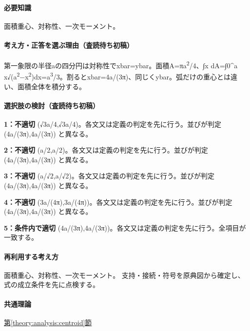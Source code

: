 \paragraph{必要知識} 面積重心、対称性、一次モーメント。

\paragraph{考え方・正答を選ぶ理由（査読待ち初稿）} 第一象限の半径aの四分円は対称性でxbar=\allowbreak{}ybar。面積A=πa\textsuperscript{2}/4、∫x dA=∫0\textasciicircum{}a x√(a\textsuperscript{2}−x\textsuperscript{2})dx=\allowbreak{}a\textsuperscript{3}/3。割るとxbar=\allowbreak{}4a/(3π)、同じくybar。弧だけの重心とは違い、面積全体を積分する。

\paragraph{選択肢の検討（査読待ち初稿）}\mbox{}\par

\noindent\textbf{1：不適切} (√3a/4,√3a/4)。各文又は定義の判定を先に行う。並びが判定 (4a/(3π),4a/(3π)) と異なる。\par

\noindent\textbf{2：不適切} (a/2,a/2)。各文又は定義の判定を先に行う。並びが判定 (4a/(3π),4a/(3π)) と異なる。\par

\noindent\textbf{3：不適切} (a/√2,a/√2)。各文又は定義の判定を先に行う。並びが判定 (4a/(3π),4a/(3π)) と異なる。\par

\noindent\textbf{4：不適切} (3a/(4π),3a/(4π))。各文又は定義の判定を先に行う。並びが判定 (4a/(3π),4a/(3π)) と異なる。\par

\noindent\textbf{5：条件内で適切} (4a/(3π),4a/(3π))。各文又は定義の判定を先に行う。全項目が一致する。\par

\paragraph{再利用する考え方} 面積重心、対称性、一次モーメント。 支持・接続・符号を原典図から確定し、式の成立条件を先に点検する。

\paragraph{共通理論} \hyperref[theory:analysis:centroid]{第\ref*{theory:analysis:centroid}節}

